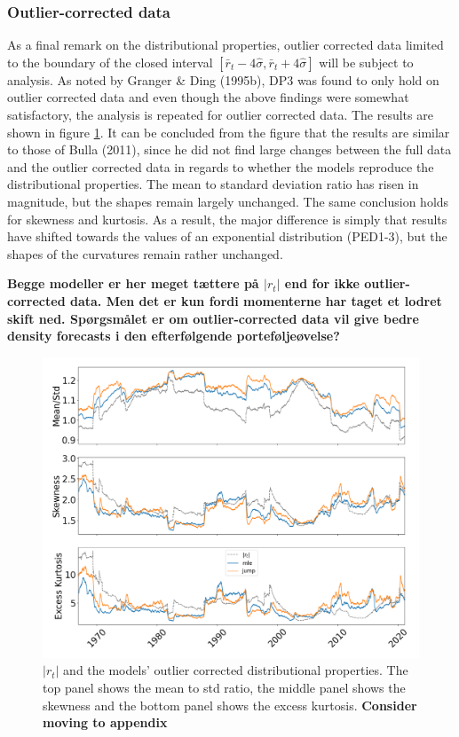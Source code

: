 \subsubsection{Outlier-corrected data}

As a final remark on the distributional properties, outlier corrected data limited to the boundary of the closed interval $[\bar r_t - 4\hat\sigma, \bar r_t + 4\hat\sigma]$ will be subject to analysis. As noted by Granger \& Ding (1995b), DP3 was found to only hold on outlier corrected data and even though the above findings were somewhat satisfactory, the analysis is repeated for outlier corrected data. The results are shown in figure \ref{fig:stylized_facts_moments_bulla_abs_outliers}. It can be concluded from the figure that the results are similar to those of Bulla (2011), since he did not find large changes between the full data and the outlier corrected data in regards to whether the models reproduce the distributional properties. The mean to standard deviation ratio has risen in magnitude, but the shapes remain largely unchanged. The same conclusion holds for skewness and kurtosis. As a result, the major difference is simply that results have shifted towards the values of an exponential distribution (PED1-3), but the shapes of the curvatures remain rather unchanged.

\textbf{Begge modeller er her meget tættere på $|r_t|$ end for ikke outlier-corrected data. Men det er kun fordi momenterne har taget et lodret skift ned. Spørgsmålet er om outlier-corrected data vil give bedre density forecasts i den efterfølgende porteføljeøvelse?}

\begin{figure}[H] 
    \centering
    \includegraphics[width=1.0\textwidth, height = 0.4\textheight]{analysis/stylized_facts/images/moments_bulla_abs_outlier.png}
    \caption[$|r_t|$ and the models' outlier corrected distributional properties]{$|r_t|$ and the models' outlier corrected distributional properties. The top panel shows the mean to std ratio, the middle panel shows the skewness and the bottom panel shows the excess kurtosis. \textbf{Consider moving to appendix}}
    \label{fig:stylized_facts_moments_bulla_abs_outliers} 
\end{figure}

